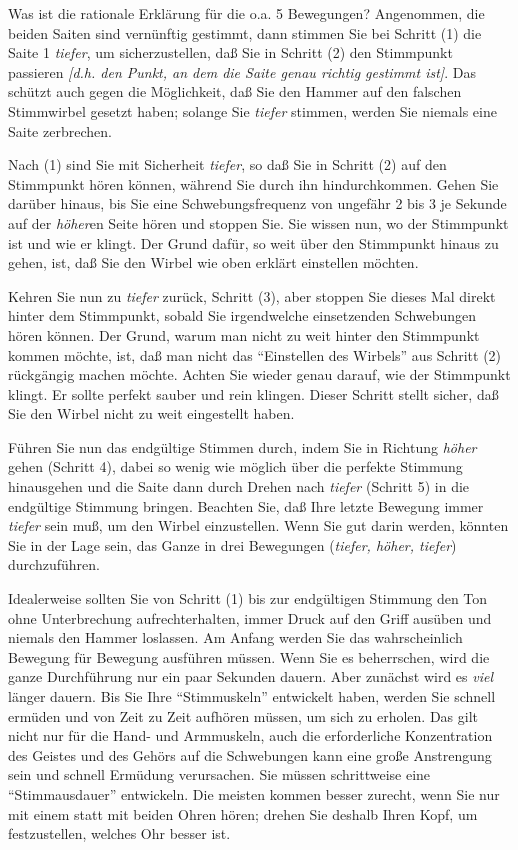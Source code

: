 Was ist die rationale Erklärung für die o.a. 5 Bewegungen?
 Angenommen, die beiden Saiten sind vernünftig gestimmt, dann stimmen Sie bei Schritt (1) die Saite 1 \textit{tiefer}, um sicherzustellen, daß Sie in Schritt (2) den Stimmpunkt passieren \textit{[d.h. den Punkt, an dem die Saite genau richtig gestimmt ist]}.
 Das schützt auch gegen die Möglichkeit, daß Sie den Hammer auf den falschen Stimmwirbel gesetzt haben; solange Sie \textit{tiefer} stimmen, werden Sie niemals eine Saite zerbrechen.
 

Nach (1) sind Sie mit Sicherheit \textit{tiefer}, so daß Sie in Schritt (2) auf den Stimmpunkt hören können, während Sie durch ihn hindurchkommen.
 Gehen Sie darüber hinaus, bis Sie eine Schwebungsfrequenz von ungefähr 2 bis 3 je Sekunde auf der \textit{höher}en Seite hören und stoppen Sie.
 Sie wissen nun, wo der Stimmpunkt ist und wie er klingt.
 Der Grund dafür, so weit über den Stimmpunkt hinaus zu gehen, ist, daß Sie den Wirbel wie oben erklärt einstellen möchten.
 

Kehren Sie nun zu \textit{tiefer} zurück, Schritt (3), aber stoppen Sie dieses Mal direkt hinter dem Stimmpunkt, sobald Sie irgendwelche einsetzenden Schwebungen hören können.
 Der Grund, warum man nicht zu weit hinter den Stimmpunkt kommen möchte, ist, daß man nicht das \enquote{Einstellen des Wirbels} aus Schritt (2) rückgängig machen möchte.
 Achten Sie wieder genau darauf, wie der Stimmpunkt klingt.
 Er sollte perfekt sauber und rein klingen.
 Dieser Schritt stellt sicher, daß Sie den Wirbel nicht zu weit eingestellt haben.
 

Führen Sie nun das endgültige Stimmen durch, indem Sie in Richtung \textit{höher} gehen (Schritt 4), dabei so wenig wie möglich über die perfekte Stimmung hinausgehen und die Saite dann durch Drehen nach \textit{tiefer} (Schritt 5) in die endgültige Stimmung bringen.
 Beachten Sie, daß Ihre letzte Bewegung immer \textit{tiefer} sein muß, um den Wirbel einzustellen.
 Wenn Sie gut darin werden, könnten Sie in der Lage sein, das Ganze in drei Bewegungen (\textit{tiefer, höher, tiefer}) durchzuführen.
 

Idealerweise sollten Sie von Schritt (1) bis zur endgültigen Stimmung den Ton ohne Unterbrechung aufrechterhalten, immer Druck auf den Griff ausüben und niemals den Hammer loslassen.
 Am Anfang werden Sie das wahrscheinlich Bewegung für Bewegung ausführen müssen.
 Wenn Sie es beherrschen, wird die ganze Durchführung nur ein paar Sekunden dauern.
 Aber zunächst wird es \textit{viel} länger dauern.
 Bis Sie Ihre \enquote{Stimmuskeln} entwickelt haben, werden Sie schnell ermüden und von Zeit zu Zeit aufhören müssen, um sich zu erholen.
 Das gilt nicht nur für die Hand- und Armmuskeln, auch die erforderliche Konzentration des Geistes und des Gehörs auf die Schwebungen kann eine große Anstrengung sein und schnell Ermüdung verursachen.
 Sie müssen schrittweise eine \enquote{Stimmausdauer} entwickeln.
 Die meisten kommen besser zurecht, wenn Sie nur mit einem statt mit beiden Ohren hören; drehen Sie deshalb Ihren Kopf, um festzustellen, welches Ohr besser ist.
 

